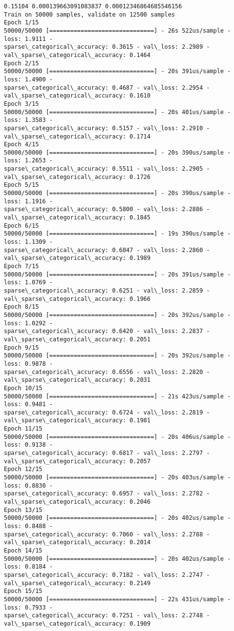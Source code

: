 \documentclass[11pt]{article}
\begin{document}
    \begin{Verbatim}[commandchars=\\\{\}]
0.15104 0.000139663091083837 0.00012346864685546156
Train on 50000 samples, validate on 12500 samples
Epoch 1/15
50000/50000 [==============================] - 26s 522us/sample - loss: 1.9111 -
sparse\_categorical\_accuracy: 0.3615 - val\_loss: 2.2989 -
val\_sparse\_categorical\_accuracy: 0.1464
Epoch 2/15
50000/50000 [==============================] - 20s 391us/sample - loss: 1.4900 -
sparse\_categorical\_accuracy: 0.4687 - val\_loss: 2.2954 -
val\_sparse\_categorical\_accuracy: 0.1610
Epoch 3/15
50000/50000 [==============================] - 20s 401us/sample - loss: 1.3583 -
sparse\_categorical\_accuracy: 0.5157 - val\_loss: 2.2910 -
val\_sparse\_categorical\_accuracy: 0.1714
Epoch 4/15
50000/50000 [==============================] - 20s 390us/sample - loss: 1.2653 -
sparse\_categorical\_accuracy: 0.5511 - val\_loss: 2.2905 -
val\_sparse\_categorical\_accuracy: 0.1726
Epoch 5/15
50000/50000 [==============================] - 20s 390us/sample - loss: 1.1916 -
sparse\_categorical\_accuracy: 0.5800 - val\_loss: 2.2886 -
val\_sparse\_categorical\_accuracy: 0.1845
Epoch 6/15
50000/50000 [==============================] - 19s 390us/sample - loss: 1.1309 -
sparse\_categorical\_accuracy: 0.6047 - val\_loss: 2.2860 -
val\_sparse\_categorical\_accuracy: 0.1989
Epoch 7/15
50000/50000 [==============================] - 20s 391us/sample - loss: 1.0769 -
sparse\_categorical\_accuracy: 0.6251 - val\_loss: 2.2859 -
val\_sparse\_categorical\_accuracy: 0.1966
Epoch 8/15
50000/50000 [==============================] - 20s 392us/sample - loss: 1.0292 -
sparse\_categorical\_accuracy: 0.6420 - val\_loss: 2.2837 -
val\_sparse\_categorical\_accuracy: 0.2051
Epoch 9/15
50000/50000 [==============================] - 20s 392us/sample - loss: 0.9878 -
sparse\_categorical\_accuracy: 0.6556 - val\_loss: 2.2820 -
val\_sparse\_categorical\_accuracy: 0.2031
Epoch 10/15
50000/50000 [==============================] - 21s 423us/sample - loss: 0.9481 -
sparse\_categorical\_accuracy: 0.6724 - val\_loss: 2.2819 -
val\_sparse\_categorical\_accuracy: 0.1981
Epoch 11/15
50000/50000 [==============================] - 20s 406us/sample - loss: 0.9138 -
sparse\_categorical\_accuracy: 0.6817 - val\_loss: 2.2797 -
val\_sparse\_categorical\_accuracy: 0.2057
Epoch 12/15
50000/50000 [==============================] - 20s 403us/sample - loss: 0.8830 -
sparse\_categorical\_accuracy: 0.6957 - val\_loss: 2.2782 -
val\_sparse\_categorical\_accuracy: 0.2046
Epoch 13/15
50000/50000 [==============================] - 20s 402us/sample - loss: 0.8488 -
sparse\_categorical\_accuracy: 0.7060 - val\_loss: 2.2788 -
val\_sparse\_categorical\_accuracy: 0.2014
Epoch 14/15
50000/50000 [==============================] - 20s 402us/sample - loss: 0.8184 -
sparse\_categorical\_accuracy: 0.7182 - val\_loss: 2.2747 -
val\_sparse\_categorical\_accuracy: 0.2149
Epoch 15/15
50000/50000 [==============================] - 22s 431us/sample - loss: 0.7933 -
sparse\_categorical\_accuracy: 0.7251 - val\_loss: 2.2748 -
val\_sparse\_categorical\_accuracy: 0.1909
    \end{Verbatim}
\end{document}
